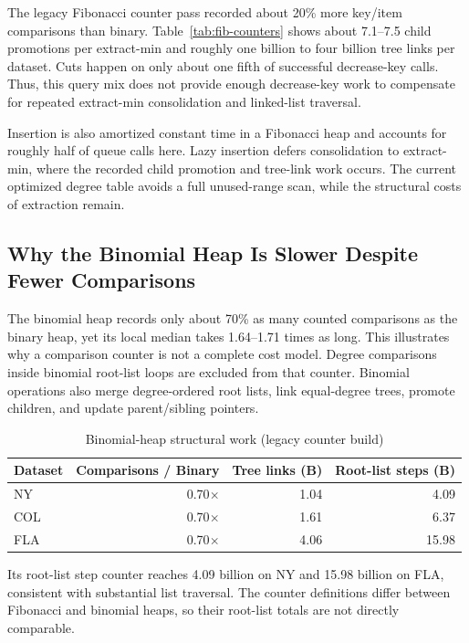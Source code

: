 \documentclass[12pt,a4paper]{report}
\begin{document}
The legacy Fibonacci counter pass recorded about 20\% more key/item
comparisons than binary. Table~\ref{tab:fib-counters} shows about 7.1--7.5 child
promotions per extract-min and roughly one billion to four billion tree links
per dataset. Cuts happen on only about one fifth of successful decrease-key calls. Thus, this query
mix does not provide enough decrease-key work to compensate for repeated
extract-min consolidation and linked-list traversal.

Insertion is also amortized constant time in a Fibonacci heap and accounts
for roughly half of queue calls here. Lazy insertion defers consolidation to
extract-min, where the recorded child promotion and tree-link work occurs.
The current optimized degree table avoids a full unused-range scan, while
the structural costs of extraction remain.

\subsection{Why the Binomial Heap Is Slower Despite Fewer Comparisons}
The binomial heap records only about 70\% as many counted comparisons as the
binary heap, yet its local median takes 1.64--1.71 times as long. This illustrates why a
comparison counter is not a complete cost model. Degree comparisons
inside binomial root-list loops are excluded from that counter. Binomial operations also
merge degree-ordered root lists, link equal-degree trees, promote children,
and update parent/sibling pointers.

\begin{table}[H]
  \centering
  \caption{Binomial-heap structural work (legacy counter build)}
  \label{tab:binomial-counters}
  \small
  \begin{tabular}{lrrr}
    \toprule
    Dataset & Comparisons / Binary & Tree links (B) & Root-list steps (B) \\
    \midrule
    NY  & 0.70$\times$ & 1.04 & 4.09 \\
    COL & 0.70$\times$ & 1.61 & 6.37 \\
    FLA & 0.70$\times$ & 4.06 & 15.98 \\
    \bottomrule
  \end{tabular}
\end{table}

Its root-list step counter reaches 4.09 billion on NY and 15.98 billion on
FLA, consistent with substantial list traversal. The counter definitions
differ between Fibonacci and binomial heaps, so their root-list totals are
not directly comparable.
\end{document}
